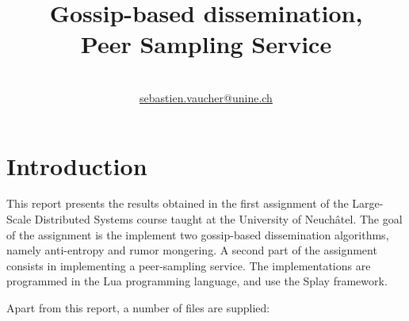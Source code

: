 \documentclass[11pt,a4paper]{scrartcl}
\author{\myauthor\\ \href{mailto:sebastien.vaucher@unine.ch}{sebastien.vaucher@unine.ch}}
\title{\huge \textbf{Gossip-based dissemination,\\ Peer Sampling Service}}
\begin{document}
\nocite{*}

\begin{titlingpage}

\begin{otherlanguage}{australian}
\maketitle
\end{otherlanguage}

\tableofcontents

\begin{table}[b]
\centering
{}
\qquad\qquad
{}
\end{table}

\end{titlingpage}

\pagebreak

\section{Introduction}

This report presents the results obtained in the first assignment of the Large-Scale Distributed Systems course taught at the University of Neuchâtel. The goal of the assignment is the implement two gossip-based dissemination algorithms, namely anti-entropy and rumor mongering. A second part of the assignment consists in implementing a peer-sampling service. The implementations are programmed in the Lua programming language, and use the Splay framework.

Apart from this report, a number of files are supplied:
\end{document}
